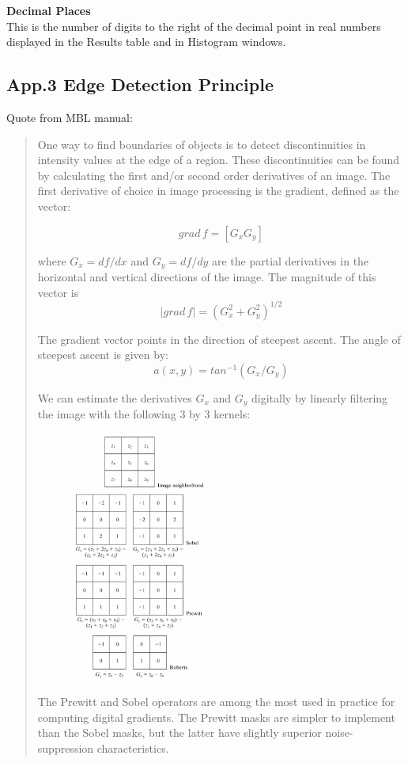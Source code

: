 \textbf{Decimal Places}\\This is the number of digits to the right
of the decimal point in real numbers displayed in the Results table and
in Histogram windows.


\clearpage


\subsection{App.3 Edge Detection Principle }
\label{app3}
Quote from MBL manual: 

\begin{quote}
One way to find boundaries of objects is to detect discontinuities in
intensity values at the edge of a region. These discontinuities can
be found by calculating the first and/or second order derivatives of an
image. The first derivative of choice in image processing is the
gradient, defined as the vector:

\[
grad\, f=[G_{x}G_{y}]
\] 

where 
$G_{x}=df/dx$ 
 and
$G_{y}=df/dy$ 
 are the partial derivatives in the horizontal and
vertical directions of the image. The magnitude of this vector is
\[
\left |  grad\, f\right |=(G_{x}^{2}+G_{y}^{2})^{1/2}
\]

The gradient vector points in the direction of steepest ascent. The
angle of steepest ascent is given by:
\[
a(x,y)=tan^{-1}(G_{x}/G_{y})
\]

We can estimate the derivatives $G_{x}$ and $G_{y}$ digitally by linearly
filtering the image with the following 3 by 3 kernels: 

\includegraphics[width=6.653cm,height=8.221cm]{img/CMCIBasicCourse201102-img153.png}

The Prewitt and Sobel operators are among the most used in practice for
computing digital gradients. The Prewitt masks are simpler to
implement than the Sobel masks, but the latter have slightly superior
noise-suppression characteristics.
\end{quote}

